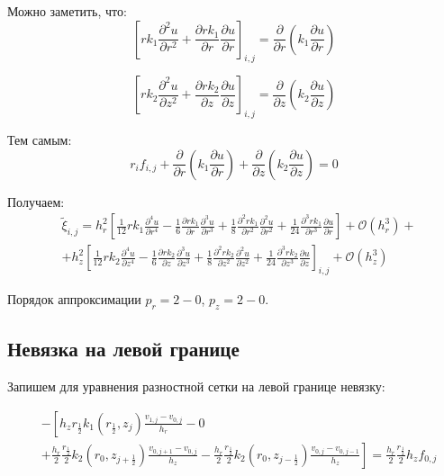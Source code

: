 Можно заметить, что:
\[
  \left[ rk_1 \frac{\partial^2 u}{\partial r^2} + \frac{\partial rk_1}{\partial r}\frac{\partial u}{\partial r} \right]_{i, j} =
  \frac{\partial}{\partial r} \left( k_1 \frac{\partial u}{\partial r} \right)
\]

\[
  \left[ r k_2 \frac{\partial^2 u}{\partial z^2} + \frac{\partial r k_2}{\partial z} \frac{\partial u}{\partial z} \right]_{i, j} =
  \frac{\partial}{\partial z} \left( k_2 \frac{\partial u}{\partial z} \right)
\]

Тем самым:
\[
  r_if_{i, j} + \frac{\partial}{\partial r} \left( k_1 \frac{\partial u}{\partial r} \right) +
  \frac{\partial}{\partial z} \left( k_2 \frac{\partial u}{\partial z} \right) = 0
\]

Получаем:
\begin{align*}
  &\tilde{\xi}_{i, j} = 
  h^2_r\left[ \frac{1}{12} r k_1 \frac{\partial^4 u}{\partial r^4} - \frac{1}{6}\frac{\partial rk_1}{\partial r}\frac{\partial^3 u}{\partial r^3}
  + \frac{1}{8} \frac{\partial^2 rk_1}{\partial r^2}\frac{\partial^2 u}{\partial r^2}
  + \frac{1}{24} \frac{\partial^3 rk_1}{\partial r^3}\frac{\partial u}{\partial r} \right] + \mathcal{O}(h_r^3) + \\
  &+ h^2_z \left[
    \frac{1}{12} r k_2 \frac{\partial^4 u}{\partial z^4} - \frac{1}{6} \frac{\partial r k_2}{\partial z} \frac{\partial^3 u}{\partial z^3}
    + \frac{1}{8} \frac{\partial^2 r k_2}{\partial z^2} \frac{\partial^2 u}{\partial z^2}
    + \frac{1}{24} \frac{\partial^3 r k_2}{\partial z^3} \frac{\partial u}{\partial z}
     \right]_{i, j} + \mathcal{O}(h_z^3)
\end{align*}

Порядок аппроксимации $p_r = 2 - 0 $, $ p_z = 2 - 0 $.

\subsection{Невязка на левой границе}

Запишем для уравнения разностной сетки на левой границе невязку:

\begin{align*}
  &- \left [ 
    h_z r_{\frac{1}{2}} k_1(r_{\frac{1}{2}}, z_j) \frac{v_{1, j} - v_{0, j}}{h_{r}}
    - 0
    \right . \\
    &\left .
    + \frac{h_r}{2} \frac{r_{\frac{1}{2}}}{2} k_2(r_0, z_{j+\frac{1}{2}}) \frac{v_{0, j + 1} - v_{0, j}}{h_{z}}
    - \frac{h_r}{2} \frac{r_{\frac{1}{2}}}{2} k_2(r_0, z_{j-\frac{1}{2}}) \frac{v_{0, j} - v_{0, j - 1}}{h_z}
    \right ]  = \frac{h_r}{2} \frac{r_{\frac{1}{2}}}{2} h_z f_{0, j}
\end{align*}


